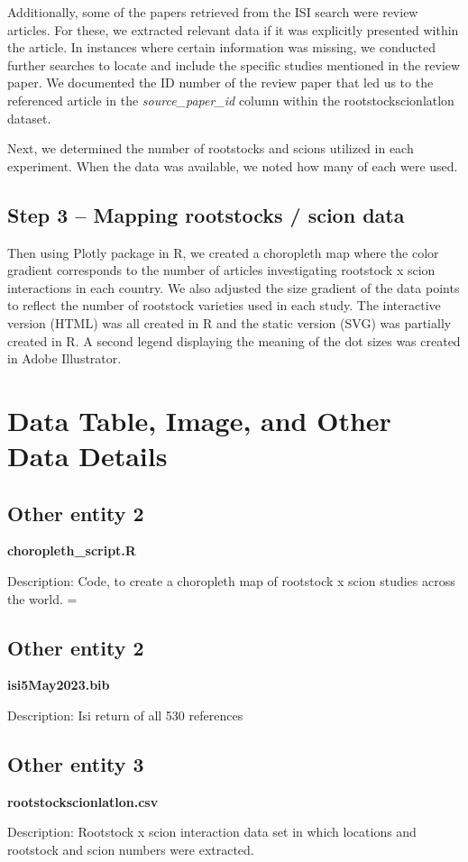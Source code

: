\documentclass[11pt, oneside]{article}   	%
\begin{document}
Additionally, some of the papers retrieved from the ISI search were review articles. For these, we extracted relevant data if it was explicitly presented within the article. In instances where certain information was missing, we conducted further searches to locate and include the specific studies mentioned in the review paper. We documented the ID number of the review paper that led us to the referenced article in the \emph{source\_paper\_id} column within the rootstockscionlatlon dataset.

Next, we determined the number of rootstocks and scions utilized in each experiment. When the data was available, we noted how many of each were used. 

\subsection{Step 3 – Mapping rootstocks / scion data}
Then using Plotly package in R, we created a choropleth map where the color gradient corresponds to the number of articles investigating rootstock x scion interactions in each country. We also adjusted the size gradient of the data points to reflect the number of rootstock varieties used in each study. The interactive version (HTML) was all created in R and the static version (SVG) was partially created in R. A second legend displaying the meaning of the dot sizes was created in Adobe Illustrator.

\section{Data Table, Image, and Other Data Details}
\subsection{Other entity 2}
\textbf{choropleth\_script.R} %

Description:
Code, to create a choropleth map of rootstock x scion studies across the world. =
\subsection{Other entity 2}
\textbf{isi5May2023.bib}

Description:
Isi return of all 530 references
\subsection{Other entity 3}
\textbf{rootstockscionlatlon.csv}

Description:
Rootstock x scion interaction data set in which locations and rootstock and scion numbers were extracted.
\end{document}
